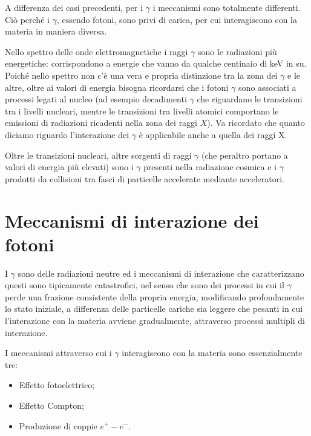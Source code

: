 A differenza dei casi precedenti, per i $\gamma$ i meccanismi sono totalmente differenti. Ciò perché i $\gamma$, essendo fotoni, sono privi di carica, per cui interagiscono con la materia in maniera diversa.

Nello spettro delle onde elettromagnetiche i raggi $\gamma$ sono le radiazioni più energetiche: corrispondono a energie che vanno da qualche centinaio di keV in su. Poiché nello spettro non c'è una vera e propria distinzione tra la zona dei $\gamma$ e le altre, oltre ai valori di energia bisogna ricordarsi che i fotoni $\gamma$ sono associati a processi legati al nucleo (ad esempio decadimenti $\gamma$ che riguardano le transizioni tra i livelli nucleari, mentre le transizioni tra livelli atomici comportano le emissioni di radiazioni ricadenti nella zona dei raggi $X$). Va ricordato che quanto diciamo riguardo l'interazione dei $\gamma$ è applicabile anche a quella dei raggi X.

Oltre le transizioni nucleari, altre sorgenti di raggi $\gamma$ (che peraltro portano a valori di energia più elevati) sono i $\gamma$ presenti nella radiazione cosmica e i $\gamma$ prodotti da collisioni tra fasci di particelle accelerate mediante acceleratori.

\section{Meccanismi di interazione dei fotoni}

I $\gamma$ sono delle radiazioni neutre ed i meccanismi di interazione che caratterizzano questi sono tipicamente catastrofici, nel senso che sono dei processi in cui il $\gamma$ perde una frazione consistente della propria energia, modificando profondamente lo stato iniziale, a differenza delle particelle cariche sia leggere che pesanti in cui l'interazione con la materia avviene gradualmente, attraverso processi multipli di interazione.

I meccanismi attraverso cui i $\gamma$ interagiscono con la materia sono essenzialmente tre:

\begin{itemize}
    \item Effetto fotoelettrico;
    \item Effetto Compton;
    \item Produzione di coppie $e^+ - e^-$.
\end{itemize}

